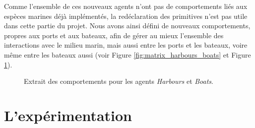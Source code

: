 Comme l'ensemble de ces nouveaux agents n'ont pas de comportements liés aux espèces marines déjà implémentés, la redéclaration des primitives n'est pas utile dans cette partie du projet. Nous avons ainsi défini de nouveaux comportements, propres aux ports et aux bateaux, afin de gérer au mieux l'ensemble des interactions avec le milieu marin, mais aussi entre les ports et les bateaux, voire même entre les bateaux aussi (voir Figure \ref{fig:matrix_harbours_boats} et Figure \ref{fig:interactions_harbours_boats}).

\begin{figure}[htbp]
	\makebox[\textwidth]{\hrulefill}{
	\small
	
	\normalsize}
	\caption{Extrait des comportements pour les agents \textit{Harbours} et \textit{Boats}.}
	\label{fig:interactions_harbours_boats}
\end{figure}

\section{L'expérimentation}

